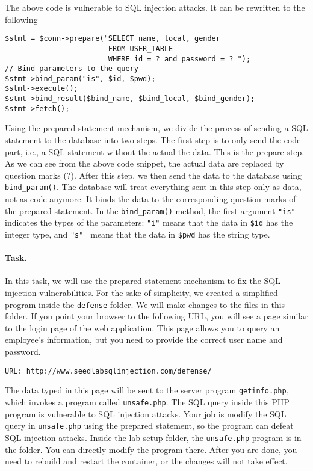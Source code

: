 The above code is vulnerable to SQL injection attacks. 
It can be rewritten to the following


\begin{lstlisting}
$stmt = $conn->prepare("SELECT name, local, gender
                        FROM USER_TABLE 
                        WHERE id = ? and password = ? ");
// Bind parameters to the query
$stmt->bind_param("is", $id, $pwd);
$stmt->execute();
$stmt->bind_result($bind_name, $bind_local, $bind_gender);
$stmt->fetch();
\end{lstlisting}


Using the prepared statement mechanism, we divide the process of sending
a SQL statement to the database into two steps.  
The first step is to only send the code part, i.e., a SQL statement without 
the actual the data. This is the prepare step. As we can see from the 
above code snippet, the actual data are replaced by question
marks (?).  After this step, we then send the data to the database using 
{\tt bind\_param()}.
The database will treat everything sent in this step only as 
data, not as code anymore. It binds the data to the corresponding
question marks of the prepared statement. 
In the {\tt bind\_param()} method, the first argument {\tt "is"} indicates
the types of the parameters: \texttt{"i"} means  
that the data in {\tt \$id} has the integer type,
and \texttt{"s" } means that the data in {\tt \$pwd} has the string type.


\paragraph{Task.} In this task, we will use the prepared statement mechanism to 
fix the SQL injection vulnerabilities. For the sake of simplicity, we 
created a simplified program inside the \texttt{defense} folder. We 
will make changes to the files in this folder. 
If you point your browser to the following URL, you will see a page similar
to the login page of the web application. This page allows you to query an 
employee's information, but you need to provide the correct 
user name and password. 


\begin{lstlisting}
URL: http://www.seedlabsqlinjection.com/defense/
\end{lstlisting}

The data typed in this page will be sent to the 
server program \texttt{getinfo.php}, which 
invokes a program called \texttt{unsafe.php}. 
The SQL query inside this PHP program 
is vulnerable to SQL injection attacks. Your job is modify the SQL 
query in \texttt{unsafe.php} using the prepared statement, so
the program can defeat SQL injection attacks.
Inside the lab setup folder, the \texttt{unsafe.php} program is 
in the  folder. You can directly 
modify the program there. After you are done, you need
to rebuild and restart the container, or the changes will not
take effect. 

